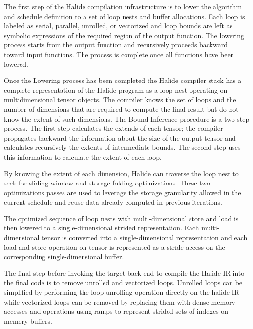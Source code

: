 \documentclass[../main.tex]{subfiles}
\begin{document}
The first step of the Halide compilation infrastructure is to lower the algorithm and schedule definition to a set of loop nests and buffer allocations. Each loop is labeled as serial, parallel, unrolled, or vectorized and loop bounds are left as symbolic expressions of the required region of the output function.
The lowering process starts from the output function and recursively proceeds backward toward input functions. 
The process is complete once all functions have been lowered.

Once the Lowering process has been completed the Halide compiler stack has a complete representation of the Halide program as a loop nest operating on multidimensional tensor objects. The compiler knows the set of loops and the number of dimensions that are required to compute the final result but do not know the extent of such dimensions.
The Bound Inference procedure is a two step process. The first step calculates the extends of each tensor; the compiler propagates backward the information about the size of the output tensor and calculates recursively the extents of intermediate bounds. The second step uses this information to calculate the extent of each loop.

By knowing the extent of each dimension, Halide can traverse the loop nest to seek for sliding window and storage folding optimizations. These two optimizations passes are used to leverage the storage granularity allowed in the current schedule and reuse data already computed in previous iterations.

The optimized sequence of loop nests with multi-dimensional store and load is then lowered to a single-dimensional strided representation. Each multi-dimensional tensor is converted into a single-dimensional representation and each load and store operation on tensor is represented as a stride access on the corresponding single-dimensional buffer.

The final step before invoking the target back-end to compile the Halide IR into the final code is to remove unrolled and vectorized loops. 
Unrolled loops can be simplified by performing the loop unrolling operation directly on the halide IR while vectorized loops can be removed by replacing them with dense memory accesses and operations using ramps to represent strided sets of indexes on memory buffers.
\end{document}
